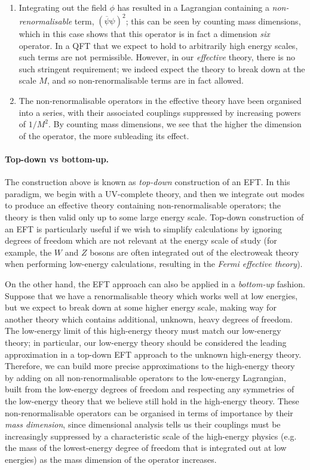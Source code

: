\documentclass[withindex,glossary]{cam-thesis}
\begin{document}
\begin{enumerate}[label = (\roman*)]
\item Integrating out the field $\phi$ has resulted in a Lagrangian containing a \textit{non-renormalisable} term, $(\overline{\psi}\psi)^2$; this can be seen by counting mass dimensions, which in this case shows that this operator is in fact a dimension \textit{six} operator. In a QFT that we expect to hold to arbitrarily high energy scales, such terms are not permissible. However, in our \textit{effective} theory, there is no such stringent requirement; we indeed expect the theory to break down at the scale $M$, and so non-renormalisable terms are in fact allowed.

\item The non-renormalisable operators in the effective theory have been organised into a series, with their associated couplings suppressed by increasing powers of $1/M^2$. By counting mass dimensions, we see that the higher the dimension of the operator, the more subleading its effect. 
\end{enumerate}

\paragraph{Top-down vs bottom-up.} The construction above is known as \textit{top-down} construction of an EFT. In this paradigm, we begin with a UV-complete theory, and then we integrate out modes to produce an effective theory containing non-renormalisable operators; the theory is then valid only up to some large energy scale. Top-down construction of an EFT is particularly useful if we wish to simplify calculations by ignoring degrees of freedom which are not relevant at the energy scale of study (for example, the $W$ and $Z$ bosons are often integrated out of the electroweak theory when performing low-energy calculations, resulting in the \textit{Fermi effective theory}).

On the other hand, the EFT approach can also be applied in a \textit{bottom-up} fashion. Suppose that we have a renormalisable theory which works well at low energies, but we expect to break down at some higher energy scale, making way for another theory which contains additional, unknown, heavy degrees of freedom. The low-energy limit of this high-energy theory must match our low-energy theory; in particular, our low-energy theory should be considered the leading approximation in a top-down EFT approach to the unknown high-energy theory. Therefore, we can build more precise approximations to the high-energy theory by adding on all non-renormalisable operators to the low-energy Lagrangian, built from the low-energy degrees of freedom and respecting any symmetries of the low-energy theory that we believe still hold in the high-energy theory. These non-renormalisable operators can be organised in terms of importance by their \textit{mass dimension}, since dimensional analysis tells us their couplings must be increasingly suppressed by a characteristic scale of the high-energy physics (e.g. the mass of the lowest-energy degree of freedom that is integrated out at low energies) as the mass dimension of the operator increases.
\end{document}
